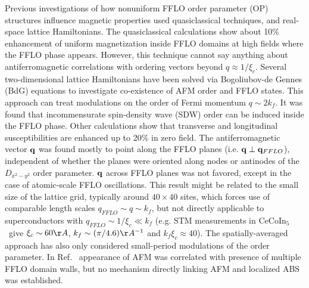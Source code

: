 \documentclass[prb,aps,showpacs,amsmath,twocolumn,10pt]{revtex4-1}
\newcommand{\cecoin}{CeCoIn$_5$}
\begin{document}
Previous investigations of how nonuniform FFLO order parameter (OP) 
structures influence magnetic properties used quasiclassical techniques,
and real-space lattice Hamiltonians. 
The quasiclassical calculations\cite{Burkhardt1994,Vorontsov:2006fc} 
show about 10\% enhancement of uniform 
magnetization inside FFLO domains at high fields where the FFLO phase appears. 
However, this technique cannot say anything about antiferromagnetic correlations 
with ordering vectors beyond $q \approx 1/\xi_c$. 
Several two-dimensional lattice Hamiltonians have been solved via Bogoliubov-de Gennes (BdG) equations 
to investigate co-existence of AFM order and FFLO states.\cite{Yanase2009, Yanase2009abs, Marcin2009, Yanase2011} 
This approach can treat modulations on the order of Fermi momentum $q \sim 2k_f$. 
It was found that incommensurate spin-density wave (SDW) order
can be induced inside the FFLO phase.\cite{Yanase2009,Yanase2009abs} 
Other calculations show that transverse and longitudinal susceptibilities are enhanced up to 20\% in zero
field.\cite{Marcin2009}
The antiferromagnetic vector ${\bf q}$ was found mostly to point along the FFLO
planes (i.e. ${\bf q} \perp {\bf q}_{FFLO}$),\cite{Yanase2009,Yanase2009abs} 
independent of whether the planes were oriented along nodes or
antinodes of the $D_{x^2-y^2}$ order parameter. 
${\bf q}$ across FFLO planes was not favored, except in the case of
atomic-scale {FFLO} oscillations.\cite{Marcin2009,Yanase2011}
This result might be related to the small size of the lattice grid, typically around $40\times40$ sites, 
which forces use of comparable length scales $q_{FFLO} \sim q \sim k_f$, 
but not directly applicable to superconductors with $ q_{FFLO} \sim 1/\xi_c \ll k_f$ 
(e.g. STM measurements\cite{Zhou:2013dq,Allan2013_stm115} in \cecoin\ give 
$\xi_c \sim 60 \AA$, $k_f \sim (\pi/4.6) \AA^{-1}$ and $k_f \xi_c \approx 40$).
The spatially-averaged approach\cite{Marcin2009} has also only considered
small-period modulations of the order parameter. 
In Ref.~ 
appearance of AFM was correlated with presence of multiple FFLO domain walls,
but no mechanism directly linking AFM and localized ABS was established. 
\end{document}
